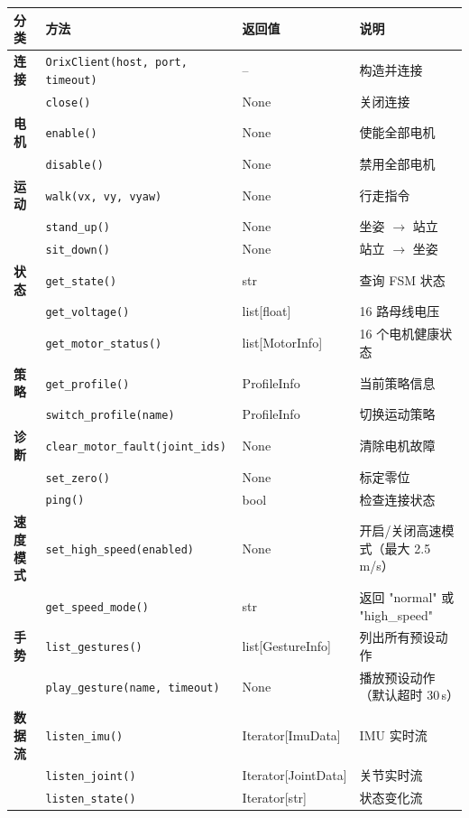 \documentclass[a4paper,11pt,openany]{book}
\begin{document}
{\small
\begin{longtable}{llll}
\toprule
分类 & 方法 & 返回值 & 说明 \\
\midrule
\endhead
\textbf{连接} & \texttt{OrixClient(host, port, timeout)} & -- & 构造并连接 \\
 & \texttt{close()} & None & 关闭连接 \\
\textbf{电机} & \texttt{enable()} & None & 使能全部电机 \\
 & \texttt{disable()} & None & 禁用全部电机 \\
\textbf{运动} & \texttt{walk(vx, vy, vyaw)} & None & 行走指令 \\
 & \texttt{stand\_up()} & None & 坐姿 $\to$ 站立 \\
 & \texttt{sit\_down()} & None & 站立 $\to$ 坐姿 \\
\textbf{状态} & \texttt{get\_state()} & str & 查询 FSM 状态 \\
 & \texttt{get\_voltage()} & list[float] & 16 路母线电压 \\
 & \texttt{get\_motor\_status()} & list[MotorInfo] & 16 个电机健康状态 \\
\textbf{策略} & \texttt{get\_profile()} & ProfileInfo & 当前策略信息 \\
 & \texttt{switch\_profile(name)} & ProfileInfo & 切换运动策略 \\
\textbf{诊断} & \texttt{clear\_motor\_fault(joint\_ids)} & None & 清除电机故障 \\
 & \texttt{set\_zero()} & None & 标定零位 \\
 & \texttt{ping()} & bool & 检查连接状态 \\
\textbf{速度模式} & \texttt{set\_high\_speed(enabled)} & None & 开启/关闭高速模式（最大 2.5\,m/s） \\
 & \texttt{get\_speed\_mode()} & str & 返回 "normal" 或 "high\_speed" \\
\textbf{手势} & \texttt{list\_gestures()} & list[GestureInfo] & 列出所有预设动作 \\
 & \texttt{play\_gesture(name, timeout)} & None & 播放预设动作（默认超时 30\,s） \\
\textbf{数据流} & \texttt{listen\_imu()} & Iterator[ImuData] & IMU 实时流 \\
 & \texttt{listen\_joint()} & Iterator[JointData] & 关节实时流 \\
 & \texttt{listen\_state()} & Iterator[str] & 状态变化流 \\
\bottomrule
\end{longtable}
}
\end{document}

